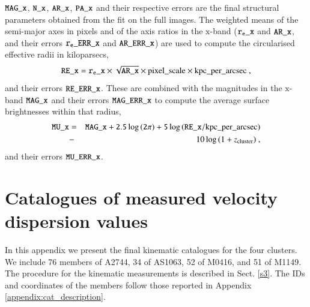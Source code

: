 \documentclass{aa}
\begin{document}
\begin{appendix}
$\tt{MAG\_x}$,   $\tt{N\_x}$,  $\tt{AR\_x}$,  $\tt{PA\_x}$ and their respective errors are the final structural parameters obtained from the fit on the full images. The weighted means of the semi-major axes in pixels and of the axis ratios in the $\mathrm{x}$-band ($\tt{r_{e}\_x}$ and $\tt{AR\_x}$, and their errors $\tt{r_{e}\_ERR\_x}$ and $\tt{AR\_ERR\_x}$) are used to compute the circularised effective radii in kiloparsecs, 
\begin{equation}
\tt{RE\_x} = \tt{r_{e}\_x} \times \sqrt{\tt{AR\_x}} \times \mathrm{pixel\_scale} \times \mathrm{kpc\_per\_arcsec} \ ,
\end{equation}
and their errors $\tt{RE\_ERR\_x}$. These are combined with the magnitudes in the $\mathrm{x}$-band $\tt{MAG\_x}$ and their errors $\tt{MAG\_ERR\_x}$ to compute the average surface brightnesses within that radius,
\begin{eqnarray}
\label{weighted_average_formula}
\nonumber \tt{MU\_x} &=&  \tt{MAG\_x} + 2.5 \log{(2 \pi)} + 5 \log{(\tt{RE\_x}}  / \mathrm{kpc\_per\_arcsec}) \\
&-& 10 \log{(1 + z_{\mathrm{cluster}})} \ ,
\end{eqnarray}
and their errors $\tt{MU\_ERR\_x}$.

\onecolumn
\section{Catalogues of measured velocity dispersion values}\label{appc}
In this appendix we present the final kinematic catalogues for the four clusters. We include 76 members of A2744, 34 of AS1063, 52 of M0416, and 51 of M1149. The procedure for the kinematic measurements is described in Sect. \ref{s3}. The IDs and coordinates of the members follow those reported in Appendix \ref{appendix:cat_description}.


\end{appendix}
\end{document}
